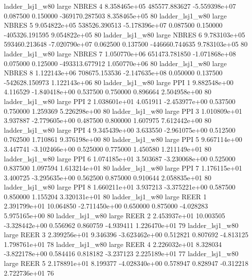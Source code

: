     ladder_lsj1_w80      large    NBRES                 4 8.358465e+05 485577.883627 -5.559398e+07 0.087500 0.150000 -369170.287503 8.358465e+05 80
    ladder_lsj1_w80      large    NBRES                 5 9.054822e+05 538526.390513 -5.178396e+07 0.087500 0.150000 -405326.191595 9.054822e+05 80
    ladder_lsj1_w80      large    NBRES                 6 9.783103e+05 593460.213648 -7.020790e+07 0.062500 0.137500 -446660.744635 9.783103e+05 80
    ladder_lsj1_w80      large    NBRES                 7 1.050770e+06 651473.781850 -1.071868e+08 0.075000 0.125000 -493313.677912 1.050770e+06 80
    ladder_lsj1_w80      large    NBRES                 8 1.122143e+06 708675.153536 -2.147635e+08 0.050000 0.137500 -542628.150973 1.122143e+06 80
    ladder_lsj1_w80      large      PPI                 1 9.882548e+00      4.116529 -1.840418e+00 0.537500 0.750000       0.896664 2.504958e+00 80
    ladder_lsj1_w80      large      PPI                 2 1.038601e+01      4.051911 -2.453977e+00 0.537500 0.750000       1.259369 5.226298e+00 80
    ladder_lsj1_w80      large      PPI                 3 1.010809e+01      3.937887 -2.779605e+00 0.487500 0.800000       1.607975 7.612442e+00 80
    ladder_lsj1_w80      large      PPI                 4 9.345439e+00      3.633550 -2.961075e+00 0.512500 0.762500       1.710861 9.376198e+00 80
    ladder_lsj1_w80      large      PPI                 5 9.667114e+00      3.447741 -3.102466e+00 0.525000 0.775000       1.450580 1.211149e+01 80
    ladder_lsj1_w80      large      PPI                 6 1.074185e+01      3.503687 -3.230068e+00 0.525000 0.837500       1.097594 1.613214e+01 80
    ladder_lsj1_w80      large      PPI                 7 1.176115e+01      3.400725 -3.295635e+00 0.562500 0.875000       0.910644 2.058835e+01 80
    ladder_lsj1_w80      large      PPI                 8 1.660211e+01      3.937213 -3.375221e+00 0.587500 0.850000       1.155204 3.320131e+01 80
    ladder_lsj1_w80      large     REER                 1 2.391799e+01     10.064850 -2.711450e+00 0.650000 0.875000      -4.028283 5.975165e+00 80
    ladder_lsj1_w80      large     REER                 2 2.453937e+01     10.003505 -3.328442e+00 0.556962 0.860759      -4.939411 1.226470e+01 79
    ladder_lsj1_w80      large     REER                 3 2.399256e+01      9.346396 -3.623462e+00 0.512821 0.807692      -4.813125 1.798761e+01 78
    ladder_lsj1_w80      large     REER                 4 2.226032e+01      8.328034 -3.822178e+00 0.584416 0.818182      -3.237123 2.225189e+01 77
    ladder_lsj1_w80      large     REER                 5 2.178891e+01      8.199377 -4.028340e+00 0.578947 0.828947      -0.312218 2.722736e+01 76
